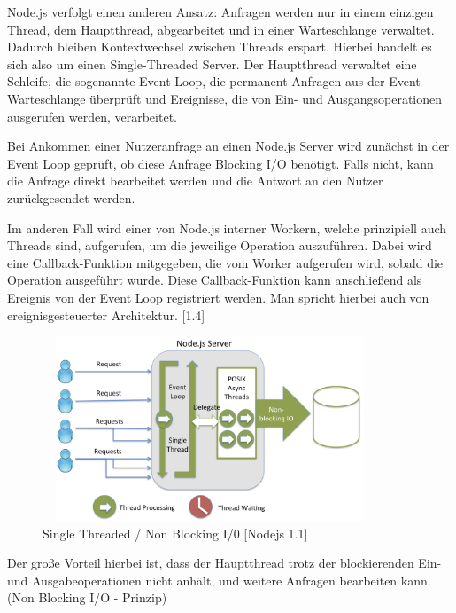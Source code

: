 \newpage

\noindent
Node.js verfolgt einen anderen Ansatz: Anfragen werden nur in einem einzigen Thread, dem Hauptthread, abgearbeitet und in einer Warteschlange verwaltet. Dadurch bleiben Kontextwechsel zwischen Threads erspart. Hierbei handelt es sich also um einen Single-Threaded Server. Der Hauptthread verwaltet eine Schleife, die sogenannte Event Loop, die permanent Anfragen aus der Event-Warteschlange überprüft und Ereignisse, die von Ein- und Ausgangsoperationen ausgerufen werden, verarbeitet.
\newline

\noindent
Bei Ankommen einer Nutzeranfrage an einen Node.js Server wird zunächst in der Event Loop geprüft, ob diese Anfrage Blocking I/O benötigt. Falls nicht, kann die Anfrage direkt bearbeitet werden und die Antwort an den Nutzer zurückgesendet werden. 
\newline

\noindent
Im anderen Fall wird einer von Node.js interner Workern, welche prinzipiell auch Threads sind, aufgerufen, um die jeweilige Operation auszuführen. Dabei wird eine Callback-Funktion mitgegeben, die vom Worker aufgerufen wird, sobald die Operation ausgeführt wurde. Diese Callback-Funktion kann anschließend als Ereignis von der Event Loop registriert werden. Man spricht hierbei auch von ereignisgesteuerter Architektur. [1.4]
\newline
 
\begin{figure}[h]
\centering
\includegraphics[width=10cm, height = 5.5cm]{images/nodejs_nodethreading.png}
\caption{ Single Threaded / Non Blocking I/0 [Nodejs 1.1]}
\end{figure}
 
 
\noindent
Der große Vorteil hierbei ist, dass der Hauptthread trotz der blockierenden Ein- und Aus\-gabeoperationen nicht anhält, und weitere Anfragen bearbeiten kann. (Non Blocking I/O - Prinzip) 
\newline

